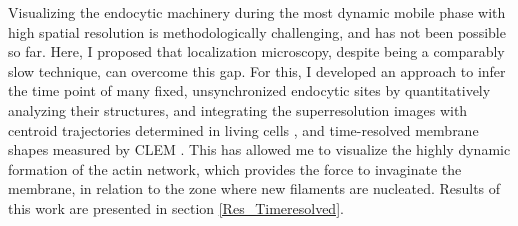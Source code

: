 Visualizing the endocytic machinery during the most dynamic mobile phase with high spatial resolution is methodologically challenging, and has not been possible so far. Here, I proposed that localization microscopy, despite being a comparably slow technique, can overcome this gap. For this, I developed an approach to infer the time point of many fixed, unsynchronized endocytic sites by quantitatively analyzing their structures, and integrating the superresolution images with centroid trajectories determined in living cells \citep{Picco:2015iv}, and time-resolved membrane shapes measured by CLEM \citep{Kukulski:2012jl}. This has allowed me to visualize the highly dynamic formation of the actin network, which provides the force to invaginate the membrane, in relation to the zone where new filaments are nucleated. Results of this work are presented in section \ref{Res_Timeresolved}.